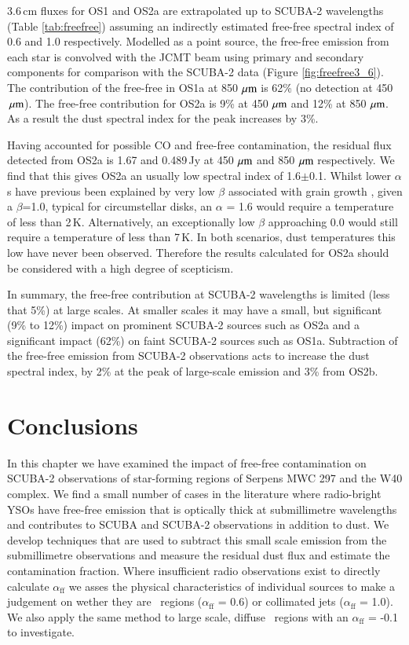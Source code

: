 3.6\,cm fluxes for OS1 and OS2a are extrapolated up to SCUBA-2 wavelengths (Table \ref{tab:freefree}) assuming an indirectly estimated free-free spectral index of 0.6 and 1.0 respectively. Modelled as a point source, the free-free emission from each star is convolved with the JCMT beam using primary and secondary components for comparison with the SCUBA-2 data (Figure \ref{fig:freefree3_6}). The contribution of the free-free in OS1a at 850\,$\,\mu\rm{m}$ 
is 62\% (no detection at 450\,$\,\mu\rm{m}$). The free-free contribution for OS2a is 9\% at 450\,$\,\mu\rm{m}$ and 
12\% at 850\,$\,\mu\rm{m}$. 
As a result the dust spectral index for the peak increases by 3\%.

Having accounted for possible CO and free-free contamination, the residual flux detected from OS2a is 1.67 and 0.489\,Jy at 450\,$\,\mu\rm{m}$ and 850\,$\,\mu\rm{m}$ respectively. We find that this gives OS2a an usually low spectral index of 1.6$\pm$0.1. 
Whilst lower $\alpha$s have previous been explained by very low $\beta$ associated with grain growth \citep{Manoj:2007ly}, given a $\beta$=1.0, typical for circumstellar disks, an $\alpha$ = 1.6 would require a temperature of less than 2\,K. Alternatively, an exceptionally low $\beta$ approaching 0.0 would still require a temperature of less than 7\,K. In both scenarios, dust temperatures this low have never been observed. Therefore the results calculated for OS2a should be considered with a high degree of scepticism.


In summary, the free-free contribution at SCUBA-2 wavelengths is limited (less that 5\%) at large 
scales. At smaller scales it may have a small, but significant (9\% to 12\%) impact on prominent 
SCUBA-2 sources such as OS2a and a significant impact (62\%) on faint SCUBA-2 sources such 
as OS1a. 
Subtraction of the free-free emission from SCUBA-2 observations acts to increase the dust spectral index, by 2\% at the  peak of large-scale emission and 3\% from OS2b. 



\section{Conclusions}
In this chapter we have examined the impact of free-free contamination on SCUBA-2 observations of star-forming regions of Serpens MWC 297 and the W40 complex. We find a small number of cases in the literature where radio-bright YSOs have free-free emission that is optically thick at submillimetre wavelengths and contributes to SCUBA and SCUBA-2 observations in addition to dust. We develop techniques that are used to subtract this small scale emission from the submillimetre observations and measure the residual dust flux and estimate the contamination fraction. Where insufficient radio observations exist to directly calculate $\alpha_{\mathrm{ff}}$ we asses the physical characteristics of individual sources to make a judgement on wether they are \UCHII\ regions ($\alpha_{\mathrm{ff}}$ = 0.6) or collimated jets ($\alpha_{\mathrm{ff}}$ = 1.0). We also apply the same method to large scale, diffuse \HII\ regions with an  $\alpha_{\mathrm{ff}}$ = -0.1 to investigate.

